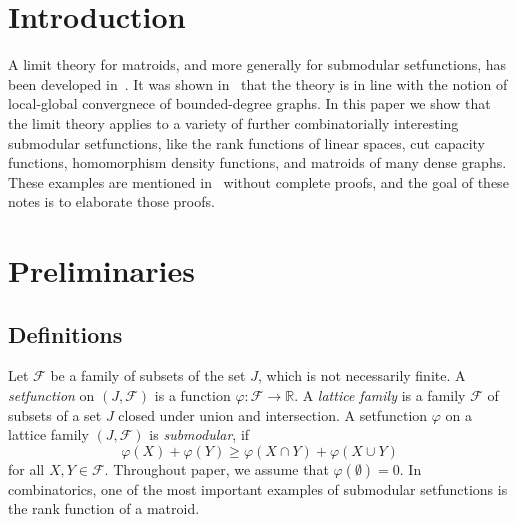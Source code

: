 \documentclass[10pt]{article}
\theoremstyle{plain}
\theoremstyle{definition}
\newcommand{\R}{\mathbb{R}}
\newcommand{\cF}{\mathcal{F}}
\newcommand{\FF}{\mathcal{F}}
\newcommand{\fg}{\varphi}
\begin{document}
\maketitle
\thispagestyle{empty}

\begin{abstract} 
To illustrate that the notion of convergence of submodular function sequences fits reasonably into the limit theory of graphs, we describe several classes of matroids and other submodular setfunctions for which convergence of appropriate sequences can be proved. Some of the proofs are surprisingly nontrivial.
\medskip

\noindent \textbf{Keywords:} Submodular function, Quotient-convergence, Matroid, Finite linear space
\end{abstract}

\tableofcontents
\newpage
{}
\setcounter{page}{1}
 \newpage


\section{Introduction}
\label{sec:intro}

A limit theory for matroids, and more generally for submodular setfunctions, has been developed in~\cite{BBLTconv}. It was shown in~\cite{BBLTgraphing} that the theory is in line with the notion of local-global convergnece of bounded-degree graphs. In this paper we show that the limit theory applies to a variety of further combinatorially interesting submodular setfunctions, like the rank functions of linear spaces, cut capacity functions, homomorphism density functions, and matroids of many dense graphs. These examples are mentioned in~\cite{BBLTconv} without complete proofs, and the goal of these notes is to elaborate those proofs.

\section{Preliminaries}
\label{sec:preliminaries}
\subsection{Definitions}
\label{sec:definitions}

Let $\cF$ be a family of subsets of the set $J$, which is not necessarily finite. A {\it setfunction} on $(J,\cF)$ is a function $\varphi\colon\cF\to\R$. A {\it lattice family} is a family $\cF$ of subsets of a set $J$ closed under union and intersection. A setfunction $\varphi$ on a lattice family $(J,\cF)$ is {\it submodular}, if 
\begin{equation*}
  \varphi(X)+\varphi(Y) \geq \varphi(X \cap Y)+\varphi(X \cup Y)  
\end{equation*}
for all $X,Y\in\FF$. Throughout paper, we assume that $\fg(\emptyset)=0$. In combinatorics, one of the most important examples of submodular setfunctions is the rank function of a matroid.
\end{document}

